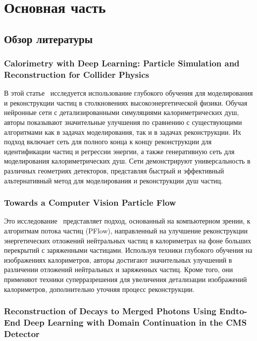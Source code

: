 \documentclass[a4paper,12pt]{extarticle}
\begin{document}
\section{Основная часть}
\label{main_body}

\subsection{Обзор литературы}
\label{main_body:literature_review}

\subsubsection*{Calorimetry with Deep Learning: Particle Simulation and Reconstruction for Collider Physics}

В этой статье~\cite{Belayneh_2020} исследуется использование глубокого обучения для моделирования и реконструкции частиц в столкновениях высокоэнергетической физики. Обучая нейронные сети с детализированными симуляциями калориметрических душ, авторы показывают значительные улучшения по сравнению с существующими алгоритмами как в задачах моделирования, так и в задачах реконструкции. Их подход включает сеть для полного конца к концу реконструкции для идентификации частиц и регрессии энергии, а также генеративную сеть для моделирования калориметрических душ. Сети демонстрируют универсальность в различных геометриях детекторов, представляя быстрый и эффективный альтернативный метод для моделирования и реконструкции душ частиц.

\subsubsection*{Towards a Computer Vision Particle Flow}

Это исследование~\cite{Di_Bello_2021} представляет подход, основанный на компьютерном зрении, к алгоритмам потока частиц (PFlow), направленный на улучшение реконструкции энергетических отложений нейтральных частиц в калориметрах на фоне больших перекрытий с заряженными частицами. Используя техники глубокого обучения на изображениях калориметров, авторы достигают значительных улучшений в различении отложений нейтральных и заряженных частиц. Кроме того, они применяют техники суперразрешения для увеличения детализации изображений калориметров, дополнительно уточняя процесс реконструкции.

\subsubsection*{Reconstruction of Decays to Merged Photons Using Endto-End Deep Learning with Domain Continuation in the CMS Detector}
\end{document}
